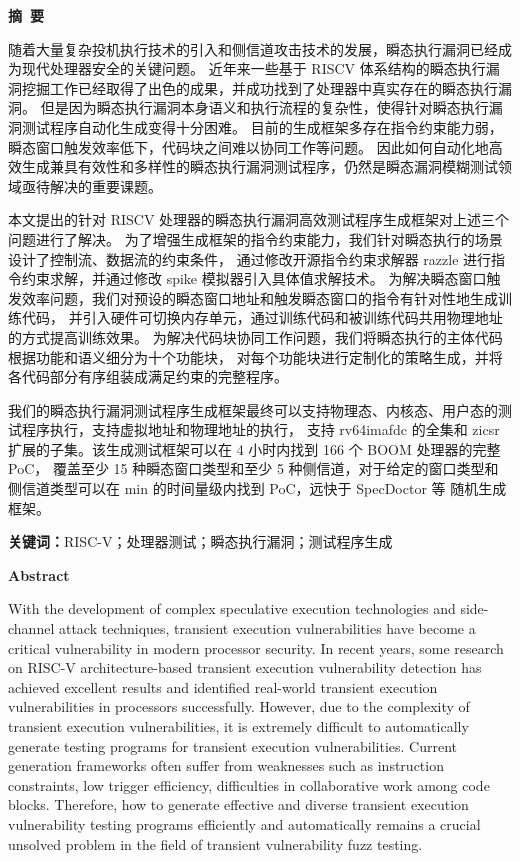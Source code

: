 \cleardoublepage{}
\begin{center}
    \bfseries {} 摘~要
\end{center}

随着大量复杂投机执行技术的引入和侧信道攻击技术的发展，瞬态执行漏洞已经成为现代处理器安全的关键问题。
近年来一些基于 RISCV 体系结构的瞬态执行漏洞挖掘工作已经取得了出色的成果，并成功找到了处理器中真实存在的瞬态执行漏洞。
但是因为瞬态执行漏洞本身语义和执行流程的复杂性，使得针对瞬态执行漏洞测试程序自动化生成变得十分困难。
目前的生成框架多存在指令约束能力弱，瞬态窗口触发效率低下，代码块之间难以协同工作等问题。
因此如何自动化地高效生成兼具有效性和多样性的瞬态执行漏洞测试程序，仍然是瞬态漏洞模糊测试领域亟待解决的重要课题。\par

本文提出的针对 RISCV 处理器的瞬态执行漏洞高效测试程序生成框架对上述三个问题进行了解决。
为了增强生成框架的指令约束能力，我们针对瞬态执行的场景设计了控制流、数据流的约束条件，
通过修改开源指令约束求解器 razzle 进行指令约束求解，并通过修改 spike 模拟器引入具体值求解技术。
为解决瞬态窗口触发效率问题，我们对预设的瞬态窗口地址和触发瞬态窗口的指令有针对性地生成训练代码，
并引入硬件可切换内存单元，通过训练代码和被训练代码共用物理地址的方式提高训练效果。
为解决代码块协同工作问题，我们将瞬态执行的主体代码根据功能和语义细分为十个功能块，
对每个功能块进行定制化的策略生成，并将各代码部分有序组装成满足约束的完整程序。\par

我们的瞬态执行漏洞测试程序生成框架最终可以支持物理态、内核态、用户态的测试程序执行，支持虚拟地址和物理地址的执行，
支持 rv64imafdc 的全集和 zicsr 扩展的子集。该生成测试框架可以在 4 小时内找到 166 个 BOOM 处理器的完整 PoC，
覆盖至少 15 种瞬态窗口类型和至少 5 种侧信道，对于给定的窗口类型和侧信道类型可以在 min 的时间量级内找到 PoC，远快于 SpecDoctor 等
随机生成框架。\par

\textbf{关键词：}RISC-V；处理器测试；瞬态执行漏洞；测试程序生成

\cleardoublepage{}
\begin{center}
    \bfseries {} Abstract
\end{center}

With the development of complex speculative execution technologies 
and side-channel attack techniques, transient execution vulnerabilities have become a critical vulnerability
in modern processor security. In recent years, 
some research on RISC-V architecture-based transient execution vulnerability detection 
has achieved excellent results and identified real-world transient execution vulnerabilities in processors successfully.
However, due to the complexity of transient execution vulnerabilities, 
it is extremely difficult to automatically generate testing programs for transient execution vulnerabilities.
Current generation frameworks often suffer from weaknesses 
such as instruction constraints, 
low trigger efficiency, difficulties in collaborative work among code blocks. 
Therefore, how to generate effective and diverse transient execution vulnerability testing programs  efficiently and automatically 
remains a crucial unsolved problem in the field of transient vulnerability fuzz testing.\par

